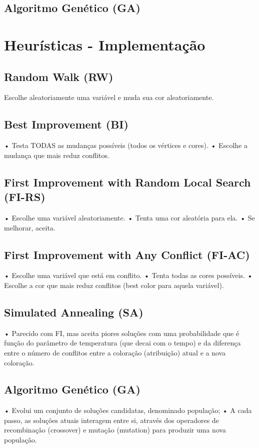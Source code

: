 \documentclass[12pt,a4paper]{article}
\begin{document}
\subsection{Algoritmo Genético (GA)}


\section{Heurísticas - Implementação}
\subsection{Random Walk (RW)}
Escolhe aleatoriamente uma variável e muda sua cor aleatoriamente.

\subsection{Best Improvement (BI)}
• Testa TODAS as mudanças possíveis (todos os vértices e cores).
• Escolhe a mudança que mais reduz conflitos.

\subsection{First Improvement with Random Local Search (FI-RS)}
• Escolhe uma variável aleatoriamente.
• Tenta uma cor aleatória para ela.
• Se melhorar, aceita.

\subsection{First Improvement with Any Conflict (FI-AC)}
• Escolhe uma variável que está em conflito.
• Tenta todas as cores possíveis.
• Escolhe a cor que mais reduz conflitos (best color para aquela variável).

\subsection{Simulated Annealing (SA)}
• Parecido com FI, mas aceita piores soluções com uma probabilidade que é
função do parâmetro de temperatura (que decai com o tempo) e da diferença
entre o número de conflitos entre a coloração (atribuição) atual e a nova
coloração.

\subsection{Algoritmo Genético (GA)}
• Evolui um conjunto de soluções candidatas, denominado população;
• A cada passo, as soluções atuais interagem entre si, através dos operadores
de recombinação (crossover) e mutação (mutation) para produzir uma nova
população.
\end{document}
